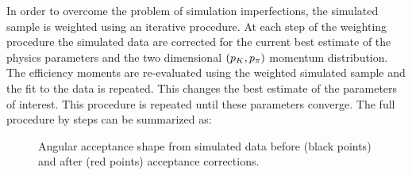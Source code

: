 In order to overcome the problem of simulation imperfections, the simulated sample is weighted using an iterative procedure.
At each step of the weighting procedure the simulated data are corrected for the current best estimate of the physics
parameters and the two dimensional $(p_{K},p_{\pi})$ momentum distribution.
The efficiency moments are re-evaluated using the weighted simulated sample and the fit to the data is repeated.
This changes the best estimate of the parameters of interest. This procedure is repeated until these parameters
converge. The full procedure by steps can be summarized as:

\begin{figure}[!t]
  \centering
  \begin{subfigure}{0.49\textwidth}
    \raggedright
    \scalebox{1.13}{}
    \caption{}
    \label{angAccCor_ctk}
  \end{subfigure}%
  \hfill%
  \begin{subfigure}{0.49\textwidth}
    \raggedleft
    \scalebox{1.13}{}
    \caption{}
    \label{angAccCorr_ctl}
  \end{subfigure}
  \vspace*{0.02\textwidth}
  \begin{subfigure}{0.49\textwidth}
    \raggedright
    \scalebox{1.13}{}
    \caption{}
    \label{angAccCorr_phi}
  \end{subfigure}
  \caption{Angular acceptance shape from simulated data before (black points) and after (red points) acceptance corrections.}
  \label{angAggCorrections}
\end{figure}

